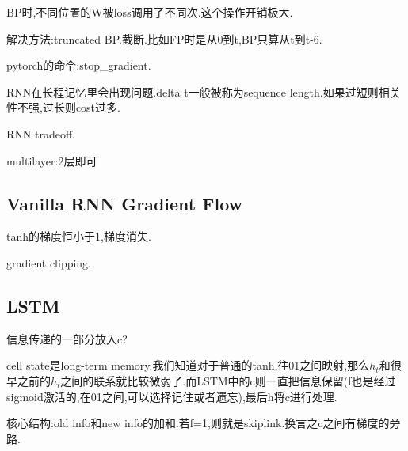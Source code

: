 	BP时,不同位置的W被loss调用了不同次.这个操作开销极大.
	
	解决方法:truncated BP.截断.比如FP时是从0到t,BP只算从t到t-6.
	
	pytorch的命令:stop\_gradient.

	RNN在长程记忆里会出现问题.delta t一般被称为sequence length.如果过短则相关性不强,过长则cost过多.
	
	RNN tradeoff.
	
	multilayer:2层即可
	
	\subsection{Vanilla RNN Gradient Flow}
	
	tanh的梯度恒小于1,梯度消失.
	
	gradient clipping.
	
	\subsection{LSTM}
	信息传递的一部分放入c?
	
	cell state是long-term memory.我们知道对于普通的tanh,往01之间映射,那么$h_t$和很早之前的$h_i$之间的联系就比较微弱了.而LSTM中的c则一直把信息保留(f也是经过sigmoid激活的,在01之间,可以选择记住或者遗忘),最后h将c进行处理.
	
	核心结构:old info和new info的加和.若f=1,则就是skiplink.换言之c之间有梯度的旁路.
